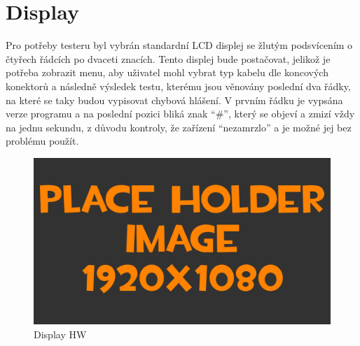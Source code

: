
\section{Display}

Pro potřeby testeru byl vybrán standardní LCD displej se žlutým podsvícením o čtyřech řádcích po dvaceti znacích. Tento displej bude postačovat, jelikož je potřeba zobrazit menu, aby uživatel mohl vybrat typ kabelu dle koncových konektorů a následně výsledek testu, kterému jsou věnovány poslední dva řádky, na které se taky budou vypisovat chybová hlášení. V prvním řádku je vypsána verze programu a na poslední pozici bliká znak “\#”, který se objeví a zmizí vždy na jednu sekundu, z důvodu kontroly, že zařízení “nezamrzlo” a je možné jej bez problému použít.

\begin{figure}[h!]
	\centering
	\includegraphics[width=\textwidth]{pictures/placeHolderFHD.png}
    	\caption{Display HW}
   	\label{fig:displayHW}
\end{figure}